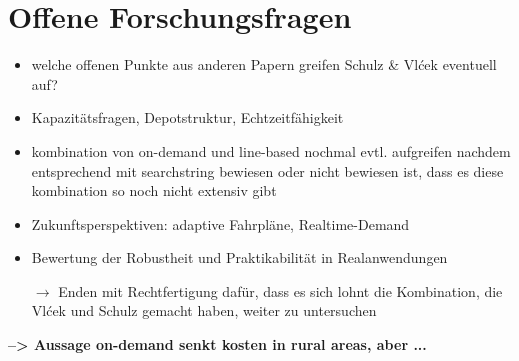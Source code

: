 
\section{Offene Forschungsfragen}
\label{sec:2.3}
\label{sec:OffeneForschungsfragen}
\begin{itemize}
    \item welche offenen Punkte aus anderen Papern greifen Schulz \& Vlćek eventuell auf?
    \item Kapazitätsfragen, Depotstruktur, Echtzeitfähigkeit
    \item kombination von on-demand und line-based nochmal evtl. aufgreifen nachdem entsprechend mit searchstring bewiesen oder nicht bewiesen ist, dass es diese kombination so noch nicht extensiv gibt
    \item Zukunftsperspektiven: adaptive Fahrpläne, Realtime-Demand
    \item Bewertung der Robustheit und Praktikabilität in Realanwendungen
    
    $\rightarrow$ Enden mit Rechtfertigung dafür, dass es sich lohnt die Kombination, die Vlćek und Schulz gemacht haben, weiter zu untersuchen
\end{itemize}

\textbf{--> Aussage on-demand senkt kosten in rural areas, aber ...}

